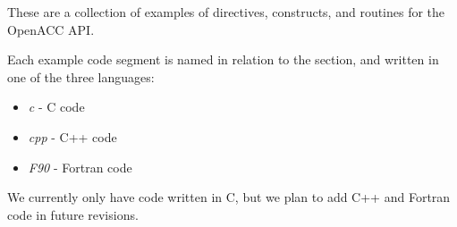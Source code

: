These are a collection of examples of directives, constructs, and routines for the OpenACC API. \newline

Each example code segment is named in relation to the section, and written in one of the three languages:

\begin{itemize}
    \item \textit{c} - C code
    \item \textit{cpp} - C++ code
    \item \textit{F90} - Fortran code
\end{itemize}

We currently only have code written in C, but we plan to add C++ and Fortran code in future revisions. 